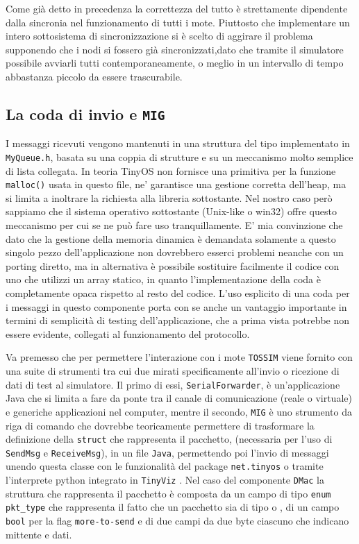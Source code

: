 \documentclass[twoside,11pt,a4paper,italian,openany]{book}
\newcommand{\tv}{\texttt{TinyViz} }
\newcommand{\tos}{\texttt{TOSSIM} }
\begin{document}
Come già detto in precedenza la correttezza del tutto è strettamente dipendente dalla sincronia 
nel funzionamento di tutti i mote. Piuttosto che implementare un intero sottosistema 
di sincronizzazione si è scelto di aggirare il problema supponendo che i nodi si fossero già 
sincronizzati,dato che  tramite il simulatore possibile avviarli tutti contemporaneamente,
 o meglio in un intervallo di tempo abbastanza piccolo da essere trascurabile. 

\subsection{La coda di invio e \texttt{MIG}}
I messaggi ricevuti vengono mantenuti in una struttura del tipo implementato in
 \texttt{MyQueue.h},
basata su una coppia di strutture e su un meccanismo molto semplice di lista collegata. 
In teoria TinyOS non fornisce una primitiva per la funzione \texttt{malloc()} usata in questo 
file, ne' garantisce una gestione corretta dell'heap, ma si limita a inoltrare la richiesta 
alla libreria sottostante.  Nel nostro caso però sappiamo che il sistema operativo sottostante 
(Unix-like o win32) offre questo meccanismo per cui se ne può fare uso tranquillamente. 
E' mia convinzione che dato che la gestione della memoria dinamica è demandata solamente a 
questo singolo pezzo dell'applicazione non dovrebbero esserci problemi neanche con un porting 
diretto, ma in alternativa è possibile sostituire facilmente il codice con uno che utilizzi un 
array statico, in quanto l'implementazione della coda è completamente opaca rispetto al 
resto del codice. 
L'uso esplicito di una coda per i messaggi in questo componente porta con se anche un 
vantaggio importante in termini di semplicità di testing dell'applicazione, che a prima vista 
potrebbe non essere evidente, collegati al funzionamento del protocollo. 

Va premesso che per permettere l'interazione con i mote \tos viene fornito con una suite di 
strumenti tra cui due mirati specificamente all'invio o ricezione di dati di test al simulatore. 
Il primo di essi, \texttt{SerialForwarder}, è un'applicazione Java che si limita a fare da ponte 
tra il canale di comunicazione (reale o virtuale) e generiche applicazioni nel computer, mentre 
il secondo, \texttt{MIG} è uno strumento da riga di comando che dovrebbe teoricamente 
permettere di trasformare la definizione della \texttt{struct} che rappresenta il pacchetto, 
(necessaria per l'uso di \texttt{SendMsg} e \texttt{ReceiveMsg}), in un file \texttt{Java}, 
permettendo poi l'invio di messaggi unendo questa classe con le  funzionalità del package 
\texttt{net.tinyos} o tramite l'interprete python integrato in \tv. 
Nel caso del componente \texttt{DMac} la struttura che rappresenta il pacchetto è composta da un campo di tipo \texttt{enum pkt\_type} che rappresenta il fatto che un pacchetto sia di 
tipo \req o \ack, di un campo \texttt{bool} 
per la flag \texttt{more-to-send} e di due campi da due byte ciascuno che indicano 
mittente e dati.
\end{document}
